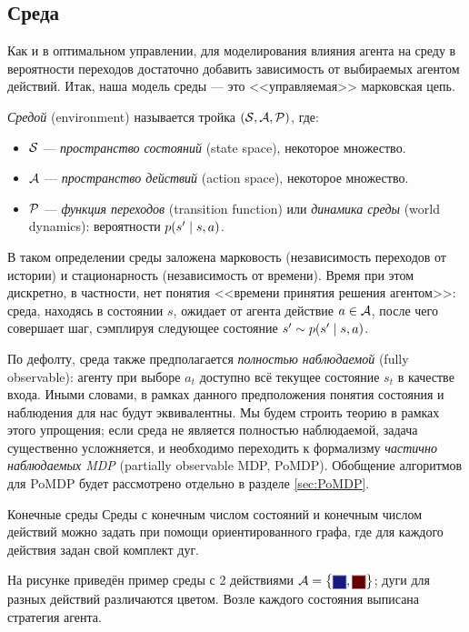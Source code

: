 \subsection{Среда}

Как и в оптимальном управлении, для моделирования влияния агента на среду в вероятности переходов достаточно добавить зависимость от выбираемых агентом действий. Итак, наша модель среды --- это <<управляемая>> марковская цепь.

\begin{definition} 
\emph{Средой} (environment) называется тройка $(\mathcal{S}, \mathcal{A}, \mathcal{P})$, где: 
\begin{itemize}
    \item $\mathcal{S}$ --- \emph{пространство состояний} (state space), некоторое множество.
    \item $\mathcal{A}$ --- \emph{пространство действий} (action space), некоторое множество.
    \item $\mathcal{P}$ --- \emph{функция переходов} (transition function) или \emph{динамика среды} (world dynamics): вероятности $p(s' \HM\mid s, a)$.
\end{itemize}
\end{definition}

В таком определении среды заложена марковость (независимость переходов от истории) и стационарность (независимость от времени). Время при этом дискретно, в частности, нет понятия <<времени принятия решения агентом>>: среда, находясь в состоянии $s$, ожидает от агента действие $a \HM\in \A$, после чего совершает шаг, сэмплируя следующее состояние $s' \HM\sim p(s' \HM\mid s, a)$.

По дефолту, среда также предполагается \emph{полностью наблюдаемой} (fully observable): агенту при выборе $a_t$ доступно всё текущее состояние $s_t$ в качестве входа. Иными словами, в рамках данного предположения понятия состояния и наблюдения для нас будут эквивалентны. Мы будем строить теорию в рамках этого упрощения; если среда не является полностью наблюдаемой, задача существенно усложняется, и необходимо переходить к формализму \emph{частично наблюдаемых MDP} (partially observable MDP, PoMDP). Обобщение алгоритмов для PoMDP будет рассмотрено отдельно в разделе \ref{sec:PoMDP}.

\begin{exampleBox}[righthand ratio=0.5, sidebyside, sidebyside align=center, lower separated=false]{Конечные среды}
Среды с конечным числом состояний и конечным числом действий можно задать при помощи ориентированного графа, где для каждого действия задан свой комплект дуг.

На рисунке приведён пример среды с 2 действиями $\A = \bigl\{ \text{\colorsquare{ChadBlue}}, \text{\colorsquare{ChadRed}} \bigr\} $; дуги для разных действий различаются цветом. Возле каждого состояния выписана стратегия агента.

\tcblower
{}
\end{exampleBox}


